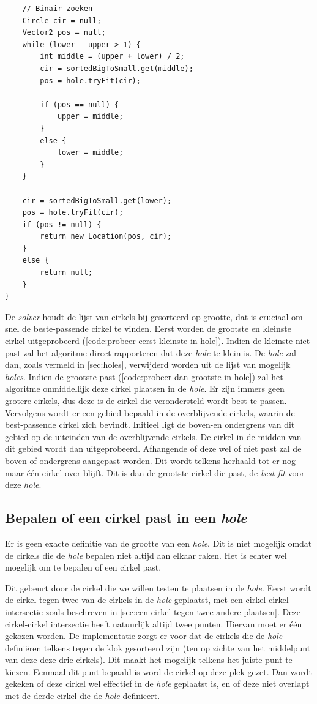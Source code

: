 \documentclass[12pt,a4paper,oneside]{book}
\begin{document}
{\begin{lstlisting}
	// Binair zoeken
	Circle cir = null;
	Vector2 pos = null;
	while (lower - upper > 1) {
		int middle = (upper + lower) / 2;
		cir = sortedBigToSmall.get(middle);
		pos = hole.tryFit(cir);

		if (pos == null) {
			upper = middle;
		}
		else {
			lower = middle;
		}
	}

	cir = sortedBigToSmall.get(lower);
	pos = hole.tryFit(cir);
	if (pos != null) {
		return new Location(pos, cir);
	}
	else {
		return null;
	}
}
\end{lstlisting}

De \textit{solver} houdt de lijst van cirkels bij gesorteerd op grootte, dat is cruciaal om snel de beste-passende cirkel te vinden.
Eerst worden de grootste en kleinste cirkel uitgeprobeerd (\autoref{code:probeer-eerst-kleinste-in-hole}).
Indien de kleinste niet past zal het algoritme direct rapporteren dat deze \textit{hole} te klein is.
De \textit{hole} zal dan, zoals vermeld in \autoref{sec:holes}, verwijderd worden uit de lijst van mogelijk \textit{holes}.
Indien de grootste past (\autoref{code:probeer-dan-grootste-in-hole}) zal het algoritme onmiddellijk deze cirkel plaatsen in de \textit{hole}.
Er zijn immers geen grotere cirkels, dus deze is de cirkel die verondersteld wordt best te passen.
Vervolgens wordt er een gebied bepaald in de overblijvende cirkels, waarin de best-passende cirkel zich bevindt.
Initieel ligt de boven-en ondergrens van dit gebied op de uiteinden van de overblijvende cirkels.
De cirkel in de midden van dit gebied wordt dan uitgeprobeerd.
Afhangende of deze wel of niet past zal de boven-of ondergrens aangepast worden.
Dit wordt telkens herhaald tot er nog maar één cirkel over blijft.
Dit is dan de grootste cirkel die past, de \textit{best-fit} voor deze \textit{hole}.

\subsection{Bepalen of een cirkel past in een \textit{hole}} \label{subsec:bepalen-of-een-cirkel-past-in-hole}

Er is geen exacte definitie van de grootte van een \textit{hole}.
Dit is niet mogelijk omdat de cirkels die de \textit{hole} bepalen niet altijd aan elkaar raken.
Het is echter wel mogelijk om te bepalen of een cirkel past.

Dit gebeurt door de cirkel die we willen testen te plaatsen in de \textit{hole}.
Eerst wordt de cirkel tegen twee van de cirkels in de \textit{hole} geplaatst, met een cirkel-cirkel intersectie zoals beschreven in \autoref{sec:een-cirkel-tegen-twee-andere-plaatsen}.
Deze cirkel-cirkel intersectie heeft natuurlijk altijd twee punten.
Hiervan moet er één gekozen worden.
De implementatie zorgt er voor dat de cirkels die de \textit{hole} definiëren telkens tegen de klok gesorteerd zijn (ten op zichte van het middelpunt van deze deze drie cirkels).
Dit maakt het mogelijk telkens het juiste punt te kiezen.
Eenmaal dit punt bepaald is word de cirkel op deze plek gezet.
Dan wordt gekeken of deze cirkel wel effectief in de \textit{hole} geplaatst is, en of deze niet overlapt met de derde cirkel die de \textit{hole} definieert.

}
\end{document}
